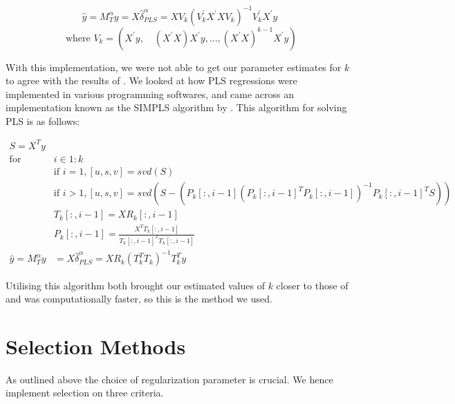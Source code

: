 \[\widehat{y} = M_{T}^{\alpha} y = X \hat{\delta}^{\alpha}_{PLS} = X V_{k}\left(V_{k}^{\prime} X^{\prime} X V_{k}\right)^{-1} V_{k}^{\prime} X^{\prime} y\]
\[\text{ where } V_{k}=\left(X^{\prime} y, \quad\left(X^{\prime} X\right) X^{\prime} y, \ldots,\left(X^{\prime} X\right)^{k-1} X^{\prime} y\right)\]

With this implementation, we were not able to get our parameter estimates for $k$ to agree with the results of \citeauthor{carrasco2016sample}. We looked at how PLS regressions were implemented in various programming softwares, and came across an implementation known as the SIMPLS algorithm by \citeauthor{de1993simpls}. This algorithm for solving PLS is as follows:

\begin{align}
\nonumber S = X^{T} y & \\
\nonumber \text{for } & i \in 1:k \\
\nonumber &\text{if } i = 1, [u, s, v] = svd(S) \\
\nonumber &\text{if } i > 1, [u, s, v] = svd(S - (P_{k}[:, i-1](P_{k}[:, i-1]^{T} P_{k}[:, i-1])^{-1} P_{k}[:, i-1]^{T} S)) \\
\nonumber &T_{k}[:, i - 1] = X R_{k}[:, i - 1] \\
\nonumber &P_{k}[:, i - 1] = \frac{X^{T} T_{k}[:, i - 1]}{T_{k}[:, i - 1]^{T}T_{k}[:, i - 1]} \\
\nonumber \widehat{y} = M^{\alpha}_{T} y &= X \hat{\delta}^{\alpha}_{PLS} = X R_{k} (T^{T}_{k} T_{k})^{-1} T^{T}_{k} y
\end{align}

Utilising this algorithm both brought our estimated values of $k$ closer to those of \citeauthor{carrasco2016sample} and was computationally faster, so this is the method we used.

\section{Selection Methods} \label{sec::cv}

As outlined above the choice of regularization parameter is crucial. We hence implement selection on three criteria.

